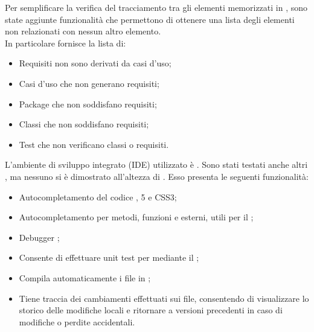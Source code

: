 \label{pdbSupport}
Per semplificare la verifica del tracciamento tra gli elementi memorizzati in \pragmadb, sono state aggiunte funzionalità che permettono di ottenere una lista degli elementi non relazionati con nessun altro elemento. \\
In particolare \pragmadb fornisce la lista di:
\begin{itemize}
\item Requisiti non sono derivati da casi d'uso;
\item Casi d'uso che non generano requisiti;
\item Package che non soddisfano requisiti;
\item Classi che non soddisfano requisiti;
\item Test che non verificano classi o requisiti.
\end{itemize}
L'ambiente di sviluppo integrato (IDE) utilizzato è \textbf{}. Sono stati testati anche altri , ma nessuno si è dimostrato all'altezza di \textbf{}. Esso presenta le seguenti funzionalità:
\begin{itemize}
\item Autocompletamento del codice ,  5 e CSS3;
\item Autocompletamento per metodi, funzioni e  esterni, utili per il ;
\item Debugger ;
\item Consente di effettuare unit test per  mediante il  \textbf{};
\item Compila automaticamente i file  in ;
\item Tiene traccia dei cambiamenti effettuati sui file, consentendo di visualizzare lo storico delle modifiche locali e ritornare a versioni precedenti in caso di modifiche o perdite accidentali.
\end{itemize}
